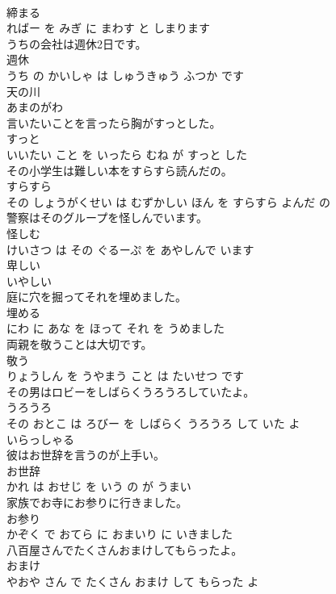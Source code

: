 \documentclass[8pt]{extreport}
\begin{document}
\begin{CJK}{UTF8}{min}
\\	締まる 
\\	ればー を みぎ に まわす と しまります			
\\	うちの会社は週休2日です。	
\\	週休 
\\	うち の かいしゃ は しゅうきゅう ふつか です			
\\	天の川	
\\	あまのがわ		
\\	言いたいことを言ったら胸がすっとした。	
\\	すっと 
\\	いいたい こと を いったら むね が すっと した			
\\	その小学生は難しい本をすらすら読んだの。	
\\	すらすら 
\\	その しょうがくせい は むずかしい ほん を すらすら よんだ の			
\\	警察はそのグループを怪しんでいます。	
\\	怪しむ 
\\	けいさつ は その ぐるーぷ を あやしんで います			
\\	卑しい	
\\	いやしい		
\\	庭に穴を掘ってそれを埋めました。	
\\	埋める 
\\	にわ に あな を ほって それ を うめました			
\\	両親を敬うことは大切です。	
\\	敬う 
\\	りょうしん を うやまう こと は たいせつ です			
\\	その男はロビーをしばらくうろうろしていたよ。	
\\	うろうろ 
\\	その おとこ は ろびー を しばらく うろうろ して いた よ			
\\	いらっしゃる	
\\	彼はお世辞を言うのが上手い。	
\\	お世辞 
\\	かれ は おせじ を いう の が うまい			
\\	家族でお寺にお参りに行きました。	
\\	お参り 
\\	かぞく で おてら に おまいり に いきました			
\\	八百屋さんでたくさんおまけしてもらったよ。	
\\	おまけ 
\\	やおや さん で たくさん おまけ して もらった よ			

\end{CJK}
\end{document}
